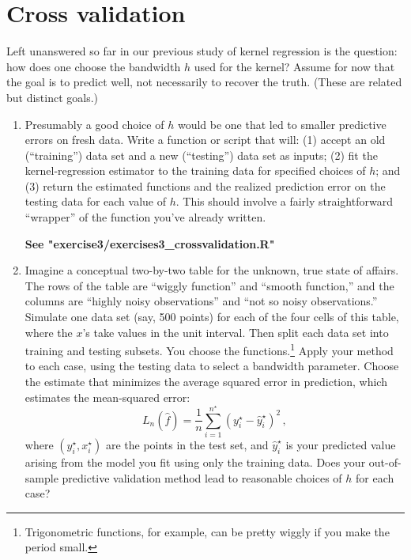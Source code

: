 \documentclass{homework}
\begin{document}
\section{Cross validation}

Left unanswered so far in our previous study of kernel regression is the question: how does one choose the bandwidth $h$ used for the kernel?  Assume for now that the goal is to predict well, not necessarily to recover the truth.  (These are related but distinct goals.)  

\begin{enumerate}[label=(\Alph*)]


\item  Presumably a good choice of $h$ would be one that led to smaller predictive errors on fresh data.  Write a function or script that will: (1) accept an old (``training'') data set and a new (``testing'') data set as inputs; (2) fit the kernel-regression estimator to the training data for specified choices of $h$; and (3) return the estimated functions and the realized prediction error on the testing data for each value of $h$.  This should involve a fairly straightforward ``wrapper'' of the function you've already written.

\textbf{See "exercise3/exercises3\_crossvalidation.R"}

\item Imagine a conceptual two-by-two table for the unknown, true state of affairs.  The rows of the table are ``wiggly function'' and ``smooth function,'' and the columns are ``highly noisy observations'' and ``not so noisy observations.''  Simulate one data set (say, 500 points) for each of the four cells of this table, where the $x$'s take values in the unit interval.  Then split each data set into training and testing subsets.  You choose the functions.\footnote{Trigonometric functions, for example, can be pretty wiggly if you make the period small.}   Apply your method to each case, using the testing data to select a bandwidth parameter.  Choose the estimate that minimizes the average squared error in prediction, which estimates the mean-squared error:
$$
L_n(\hat{f}) = \frac{1}{n}\sum_{i=1}^{n^{\star}} (y^{\star}_i - \hat{y}_i^{\star} )^2 \, ,
$$
where $(y_i^{\star}, x_i^{\star})$ are the points in the test set, and $ \hat{y}_i^{\star}$ is your predicted value arising from the model you fit using only the training data.  Does your out-of-sample predictive validation method lead to reasonable choices of $h$ for each case?


\end{enumerate}
\end{document}
